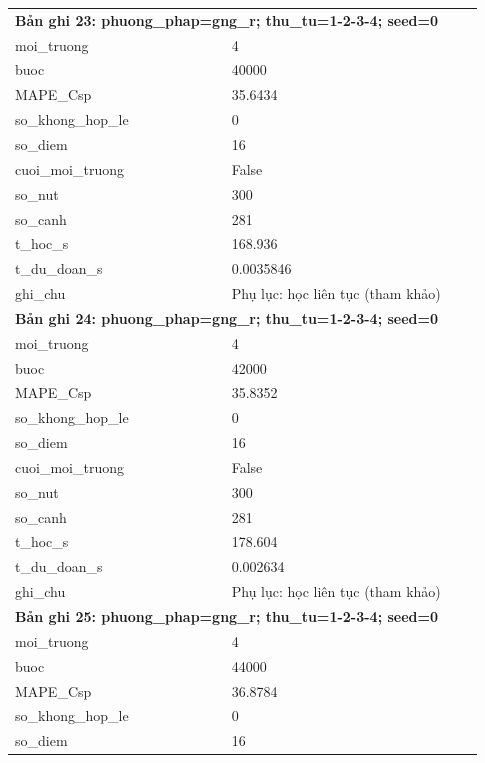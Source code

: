 \begin{longtable}{p{0.43\linewidth}p{0.50\linewidth}}
\midrule
\multicolumn{2}{p{0.95\linewidth}}{\textbf{Bản ghi 23: phuong\_phap=gng\_r; thu\_tu=1-2-3-4; seed=0}} \\
moi\_\allowbreak truong & 4 \\
buoc & 40000 \\
MAPE\_\allowbreak Csp & 35.6434 \\
so\_\allowbreak khong\_\allowbreak hop\_\allowbreak le & 0 \\
so\_\allowbreak diem & 16 \\
cuoi\_\allowbreak moi\_\allowbreak truong & False \\
so\_\allowbreak nut & 300 \\
so\_\allowbreak canh & 281 \\
t\_\allowbreak hoc\_\allowbreak s & 168.936 \\
t\_\allowbreak du\_\allowbreak doan\_\allowbreak s & 0.0035846 \\
ghi\_\allowbreak chu & Phụ lục: học liên tục (tham khảo) \\
\midrule
\multicolumn{2}{p{0.95\linewidth}}{\textbf{Bản ghi 24: phuong\_phap=gng\_r; thu\_tu=1-2-3-4; seed=0}} \\
moi\_\allowbreak truong & 4 \\
buoc & 42000 \\
MAPE\_\allowbreak Csp & 35.8352 \\
so\_\allowbreak khong\_\allowbreak hop\_\allowbreak le & 0 \\
so\_\allowbreak diem & 16 \\
cuoi\_\allowbreak moi\_\allowbreak truong & False \\
so\_\allowbreak nut & 300 \\
so\_\allowbreak canh & 281 \\
t\_\allowbreak hoc\_\allowbreak s & 178.604 \\
t\_\allowbreak du\_\allowbreak doan\_\allowbreak s & 0.002634 \\
ghi\_\allowbreak chu & Phụ lục: học liên tục (tham khảo) \\
\midrule
\multicolumn{2}{p{0.95\linewidth}}{\textbf{Bản ghi 25: phuong\_phap=gng\_r; thu\_tu=1-2-3-4; seed=0}} \\
moi\_\allowbreak truong & 4 \\
buoc & 44000 \\
MAPE\_\allowbreak Csp & 36.8784 \\
so\_\allowbreak khong\_\allowbreak hop\_\allowbreak le & 0 \\
so\_\allowbreak diem & 16 \\

\end{longtable}
